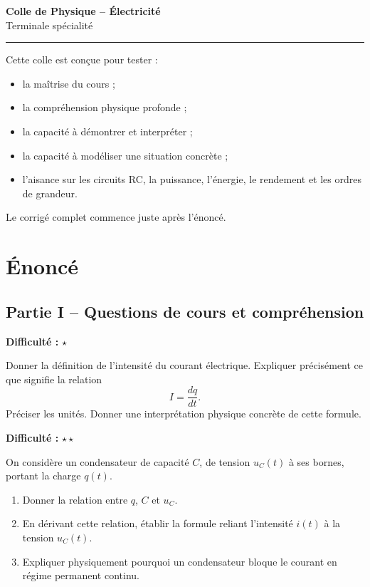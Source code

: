 \documentclass[11pt,a4paper]{article}
\newcommand{\etoiles}[1]{\textbf{Difficulté :} #1}
\begin{document}
\begin{center}
    {\LARGE \textbf{Colle de Physique -- Électricité}}\\[0.2cm]
    {\large Terminale spécialité}\\[0.3cm]
    \rule{0.8\textwidth}{0.5pt}
\end{center}

\begin{importantbox}
Cette colle est conçue pour tester :
\begin{itemize}
    \item la maîtrise du cours ;
    \item la compréhension physique profonde ;
    \item la capacité à démontrer et interpréter ;
    \item la capacité à modéliser une situation concrète ;
    \item l'aisance sur les circuits RC, la puissance, l'énergie, le rendement et les ordres de grandeur.
\end{itemize}
Le corrigé complet commence juste après l'énoncé.
\end{importantbox}

\tableofcontents

\newpage

\section{Énoncé}

\subsection{Partie I -- Questions de cours et compréhension}

\begin{exercisebox}
\etoiles{\(\star\)}

Donner la définition de l'intensité du courant électrique. Expliquer précisément ce que signifie la relation
\[
I=\frac{dq}{dt}.
\]
Préciser les unités. Donner une interprétation physique concrète de cette formule.
\end{exercisebox}

\begin{exercisebox}
\etoiles{\(\star\star\)}

On considère un condensateur de capacité \(C\), de tension \(u_C(t)\) à ses bornes, portant la charge \(q(t)\).

\begin{enumerate}[label=\alph*)]
    \item Donner la relation entre \(q\), \(C\) et \(u_C\).
    \item En dérivant cette relation, établir la formule reliant l'intensité \(i(t)\) à la tension \(u_C(t)\).
    \item Expliquer physiquement pourquoi un condensateur bloque le courant en régime permanent continu.
\end{enumerate}
\end{exercisebox}
\end{document}
